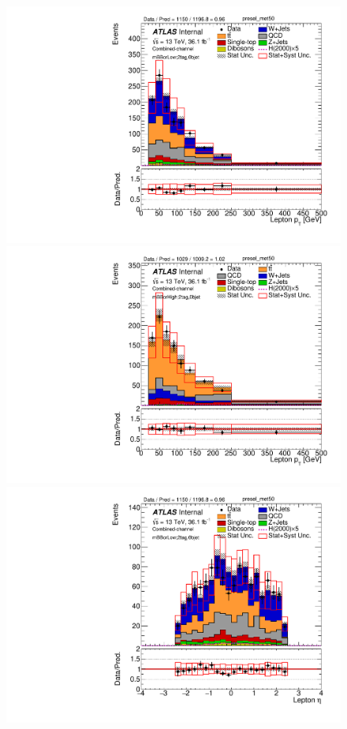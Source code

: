 \begin{figure}[!h]
\begin{center}
\includegraphics[scale=0.33]{./figures/boosted/PlotByMbbRegions/DataMC_2tag_0bjet_mbbcrLow_lepton_presel_met50_LepPt}                                                                               
\includegraphics[scale=0.33]{./figures/boosted/PlotByMbbRegions/DataMC_2tag_0bjet_mbbcrHigh_lepton_presel_met50_LepPt}                                                                              
\includegraphics[scale=0.33]{./figures/boosted/PlotByMbbRegions/DataMC_2tag_0bjet_mbbcrLow_lepton_presel_met50_LepEta}                                                                              

\end{center}
\end{figure}
